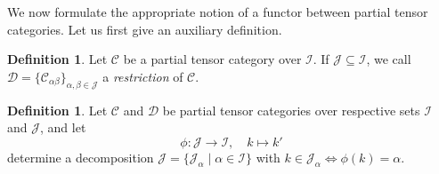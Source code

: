 \documentclass[10pt]{article}
\newcommand{\CatC}{\mathcal{C}}
\newcommand{\CatCC}{\mathscr{C}}
\newcommand{\CatDD}{\mathscr{D}}
\theoremstyle{definition}
\newtheorem{Def}[Theorem]{Definition}
\numberwithin{equation}{section}
\begin{document}
We now formulate the appropriate notion of a functor between partial tensor categories. Let us first give an auxiliary definition.

\begin{Def} Let $\CatCC$ be a partial tensor category over $\mathscr{I}$. If $\mathscr{J}\subseteq \mathscr{I}$, we call $\CatDD = \{\CatC_{\alpha\beta}\}_{\alpha,\beta\in \mathscr{J}}$ a \emph{restriction} of $\CatCC$. 
\end{Def} 

\begin{Def} Let $\CatCC$ and $\CatDD$ be partial tensor categories over respective sets $\mathscr{I}$ and $\mathscr{J}$, and let \[\phi:\mathscr{J}\rightarrow \mathscr{I},\quad k \mapsto k'\] determine a decomposition $\mathscr{J} = \{\mathscr{J}_\alpha\mid \alpha\in \mathscr{I}\}$ with $k\in \mathscr{J}_\alpha \iff \phi(k)=\alpha$. 


\end{Def}
\end{document}
